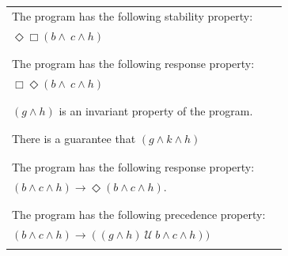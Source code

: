 \documentclass[12pt]{article}
\begin{document}
\begin{enumerate}
\begin{table}
\begin{tabular}{|l|l|}
The program has the following stability property: &\\
$\Diamond \Box (b \wedge \ c \wedge h)$		 &\\

&\\

\hline

&\\
		
The program has the following response property: &\\
$\Box \Diamond (b \wedge \ c \wedge h)$		 &\\

&\\

\hline

&\\
		
$( g \wedge h)$ is an invariant property of the program.  &\\

&\\

\hline

&\\
		
There is a guarantee that $(g \wedge k \wedge h)$	 &\\

&\\

\hline

&\\
		
The program has the following response property: &\\
$(b \wedge c \wedge h) \rightarrow \Diamond (b \wedge c \wedge h)$.   &\\

&\\

\hline

&\\
		
The program has the following precedence property: &\\
$(b \wedge c \wedge h) \rightarrow ( (g \wedge h) ~\mathcal{U}~ b \wedge c \wedge h))$
			 &\\
&\\

\hline

\end{tabular}
\end{table}


\end{enumerate}
\end{document}
